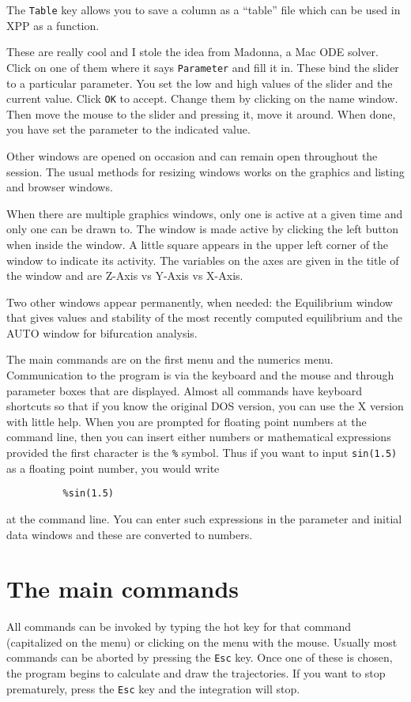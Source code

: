 \documentclass{article}
\newcommand{\bvb}{\begin{verbatim}}
\newcommand{\tcc}[1]{\addcontentsline{toc}{subsubsection}{#1}}
\begin{document}
The {\tt Table} key allows you to save a column as a ``table'' file
which can be used in XPP as a function.

\tcc{Parameter sliders}  These are really cool and I stole the idea
from Madonna, a Mac ODE solver. Click on one of them where it says
{\tt Parameter} and fill it in.  These bind the slider to a particular
parameter.  You set the low and high values of the slider and the
current value.  Click {\tt OK} to accept. Change them by clicking on
the name window.  Then move the mouse to the slider and pressing it,
move it around.  When done, you have set the parameter to the
indicated value.


Other windows are opened on occasion and can remain open throughout the
 session.  The usual methods for resizing windows works on the graphics and
 listing and browser windows.

When there are multiple graphics windows, only one is active at a given time
 and only one can be drawn to.  The window is made active by clicking the
 left button when inside the window.  A little square appears in the upper left
 corner of the window to indicate its activity.  The variables on the
 axes are given in the title of the window and are Z-Axis vs Y-Axis vs X-Axis.


Two other windows appear permanently, when needed: the Equilibrium window
 that gives values and stability of the most recently computed
 equilibrium and the AUTO window for bifurcation analysis.


The main commands are on the first menu and the numerics menu.  Communication
to the program is via the keyboard and the mouse and through parameter boxes
 that are displayed.  Almost all commands have keyboard shortcuts so that if
 you know the original DOS version, you can use the X version with little help.
When you are prompted for floating point numbers at the command line, then
you can insert either numbers or mathematical expressions provided the first
 character is the {\tt \%} symbol. Thus if you want to input {\tt sin(1.5)} as a floating
point number, you would write
\bvb
          %sin(1.5)
\end{verbatim}
at the command line. You can enter such expressions in the parameter and
initial data windows and these are converted to numbers.


\section{The main commands}
All commands can be invoked by typing the hot key for that command (capitalized
 on the menu) or clicking on the menu with the mouse.  Usually most commands can
 be aborted by pressing the {\tt Esc} key. Once one of these is chosen, the
 program begins to calculate and draw the trajectories.  If you want to
 stop prematurely, press the {\tt Esc} key and the integration will
stop.
\end{document}
